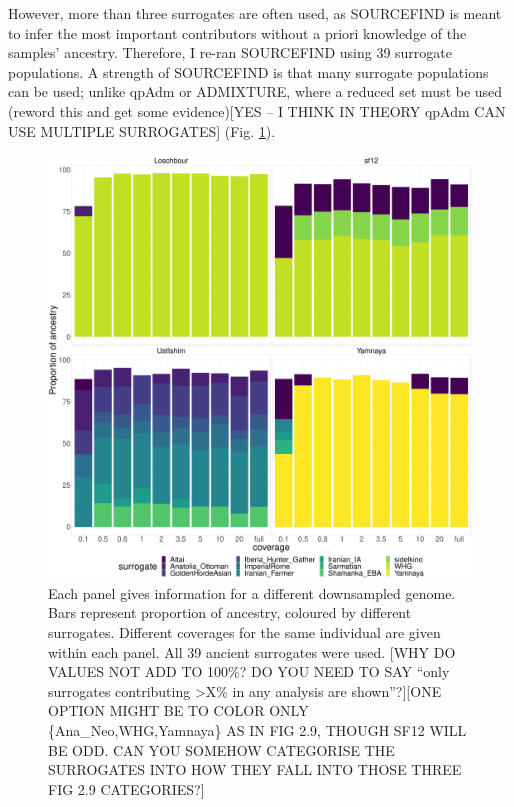 However, more than three surrogates are often used, as SOURCEFIND is meant to infer the most important contributors without a priori knowledge of the samples' ancestry. Therefore, I re-ran SOURCEFIND using 39 surrogate populations. A strength of SOURCEFIND is that many surrogate populations can be used; unlike qpAdm or ADMIXTURE, {\color{red}where a reduced set must be used (reword this and get some evidence)[YES -- I THINK IN THEORY qpAdm CAN USE MULTIPLE SURROGATES]} (Fig. \ref{fig:SOURCEFIND_AllPSop_downsampled}). 

\begin{figure}[htp]
    \centering
    \includegraphics[width=1.0\textwidth]{../images/chapter1/Allpops_SF_downsampled.pdf}
    \caption{Each panel gives information for a different downsampled genome. Bars represent proportion of ancestry, coloured by different surrogates. Different coverages for the same individual are given within each panel. All 39 ancient surrogates were used. {\color{red}[WHY DO VALUES NOT ADD TO 100\%? DO YOU NEED TO SAY ``only surrogates contributing >X\% in any analysis are shown''?]}{\color{red}[ONE OPTION MIGHT BE TO COLOR ONLY \{Ana\_Neo,WHG,Yamnaya\} AS IN FIG 2.9, THOUGH SF12 WILL BE ODD. CAN YOU SOMEHOW CATEGORISE THE SURROGATES INTO HOW THEY FALL INTO THOSE THREE FIG 2.9 CATEGORIES?]}}
    \label{fig:SOURCEFIND_AllPSop_downsampled}
\end{figure}

